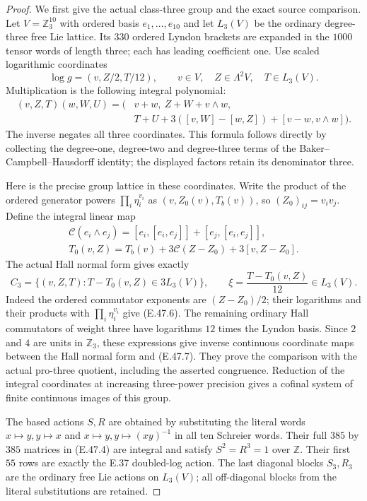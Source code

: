 \begin{proof}
We first give the actual class-three group and
the exact source comparison.  Let $V=\mathbb Z_3^{10}$
with ordered basis $e_1,\ldots,e_{10}$ and let
$L_3(V)$ be the ordinary degree-three free Lie
lattice.  Its $330$ ordered Lyndon brackets are
expanded in the $1000$ tensor words of length
three; each has leading coefficient one.
Use scaled logarithmic coordinates
\[
 \log g=(v,Z/2,T/12),\qquad
 v\in V,\quad Z\in\Lambda^2V,\quad T\in L_3(V).
 \tag{E.47.4}
\]
Multiplication is the following integral polynomial:
\[
 \begin{split}
 (v,Z,T)(w,W,U)=\bigl(&v+w,\ Z+W+v\wedge w,\\
 &T+U+3([v,W]-[w,Z])+[v-w,v\wedge w]\bigr).
 \end{split}
 \tag{E.47.5}
\]
The inverse negates all three coordinates.
This formula follows directly by collecting the
degree-one, degree-two and degree-three terms of
the Baker--Campbell--Hausdorff identity; the
displayed factors retain its denominator three.

Here is the precise group lattice in these
coordinates.  Write the product of the ordered
generator powers $\prod_i\eta_i^{v_i}$ as
$(v,Z_0(v),T_b(v))$, so $(Z_0)_{ij}=v_iv_j$.
Define the integral linear map
\[
 \begin{gathered}
 \mathcal C(e_i\wedge e_j)
 =[e_i,[e_i,e_j]]+[e_j,[e_i,e_j]],
 \\
 T_0(v,Z)=T_b(v)+3\mathcal C(Z-Z_0)+3[v,Z-Z_0].
 \end{gathered}
 \tag{E.47.6}
\]
The actual Hall normal form gives exactly
\[
 C_3=\{(v,Z,T):T-T_0(v,Z)\in3L_3(V)\},
 \qquad
 \xi=\frac{T-T_0(v,Z)}{12}\in L_3(V).
 \tag{E.47.7}
\]
Indeed the ordered commutator exponents are
$(Z-Z_0)/2$; their logarithms and their products
with $\prod_i\eta_i^{v_i}$ give
\textup{(E.47.6)}.  The remaining ordinary Hall
commutators of weight three have logarithms
$12$ times the Lyndon basis.  Since $2$ and $4$
are units in $\mathbb Z_3$, these expressions
give inverse continuous coordinate maps between
the Hall normal form and \textup{(E.47.7)}.
They prove the comparison with the actual pro-three
quotient, including the asserted congruence.
Reduction of the integral coordinates at increasing
three-power precision gives a cofinal system of
finite continuous images of this group.

The based actions $S,R$ are obtained by substituting
the literal words
$x\mapsto y,y\mapsto x$ and
$x\mapsto y,y\mapsto(xy)^{-1}$ in all ten
Schreier words.  Their full $385$ by $385$ matrices
in \textup{(E.47.4)} are integral and satisfy
$S^2=R^3=1$ over $\mathbb Z$.
Their first $55$ rows are exactly the E.37
doubled-log action.  The last diagonal blocks
$S_3,R_3$ are the ordinary free Lie actions on
$L_3(V)$; all off-diagonal blocks from the
literal substitutions are retained.


\end{proof}
